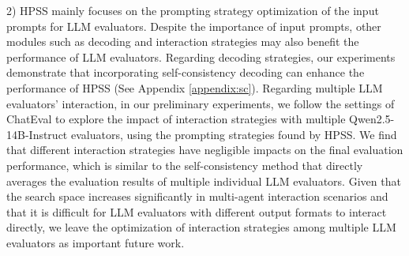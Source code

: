 2) HPSS mainly focuses on the prompting strategy optimization of the input prompts for LLM evaluators. 
Despite the importance of input prompts, other modules such as decoding and interaction strategies may also benefit the performance of LLM evaluators.
Regarding decoding strategies, our experiments demonstrate that incorporating self-consistency decoding can enhance the performance of HPSS (See Appendix \ref{appendix:sc}).
Regarding multiple LLM evaluators' interaction, in our preliminary experiments, we follow the settings of ChatEval \cite{chan2024chateval} to explore the impact of interaction strategies with multiple Qwen2.5-14B-Instruct evaluators, using the prompting strategies found by HPSS. 
We find that different interaction strategies have negligible impacts on the final evaluation performance, which is similar to the self-consistency method that directly averages the evaluation results of multiple individual LLM evaluators. 
Given that the search space increases significantly in multi-agent interaction scenarios and that it is difficult for LLM evaluators with different output formats to interact directly, we leave the optimization of interaction strategies among multiple LLM evaluators as important future work.